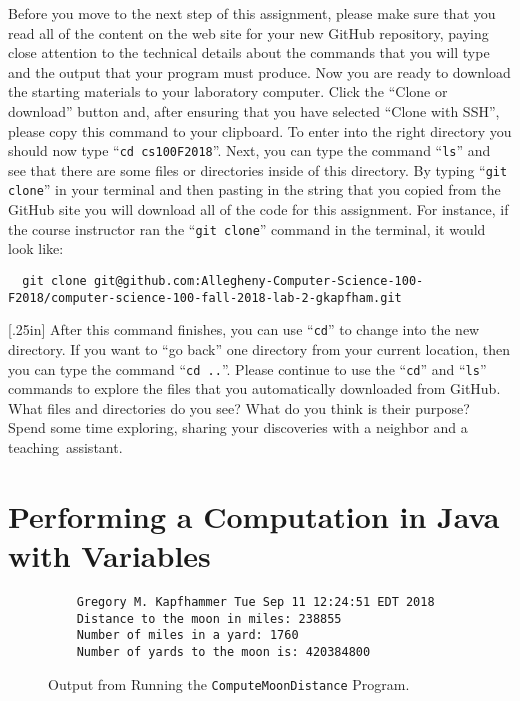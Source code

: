\documentclass[11pt]{article}
\newcommand{\command}[1]{``\lstinline{#1}''}
\newcommand{\step}[1]{``{#1}''}
\newcommand{\discuss}[1]{\null\hfill\LARGE{\faCommentO{}}\newline\scriptsize{\em{#1}}}
\begin{document}
Before you move to the next step of this assignment, please make sure that you
read all of the content on the web site for your new GitHub repository, paying
close attention to the technical details about the commands that you will type
and the output that your program must produce. Now you are ready to download the
starting materials to your laboratory computer. Click the ``Clone or download''
button and, after ensuring that you have selected ``Clone with SSH'', please
copy this command to your clipboard. To enter into the right directory you
should now type \command{cd cs100F2018}. Next, you can type the command
\command{ls} and see that there are some files or directories inside of this
directory. By typing \command{git clone} in your terminal and then pasting in
the string that you copied from the GitHub site you will download all of the
code for this assignment. For instance, if the course instructor ran the
\command{git clone} command in the terminal, it would look like:

\begin{lstlisting}
  git clone git@github.com:Allegheny-Computer-Science-100-F2018/computer-science-100-fall-2018-lab-2-gkapfham.git
\end{lstlisting}

\marginnote{\discuss{Understand project layout}}[.25in] After this command
finishes, you can use \command{cd} to change into the new directory. If you want
to \step{go back} one directory from your current location, then you can type
the command \command{cd ..}. Please continue to use the \command{cd} and
\command{ls} commands to explore the files that you automatically downloaded
from GitHub. What files and directories do you see? What do you think is their
purpose? Spend some time exploring, sharing your discoveries with a neighbor and
a \mbox{teaching assistant}.

\section*{Performing a Computation in Java with Variables}

\begin{figure}[tb]
  \begin{verbatim}
    Gregory M. Kapfhammer Tue Sep 11 12:24:51 EDT 2018
    Distance to the moon in miles: 238855
    Number of miles in a yard: 1760
    Number of yards to the moon is: 420384800
  \end{verbatim}
\vspace*{-.25in}
\caption{Output from Running the {\tt ComputeMoonDistance} Program.}
\label{fig:output}
\end{figure}
\end{document}
